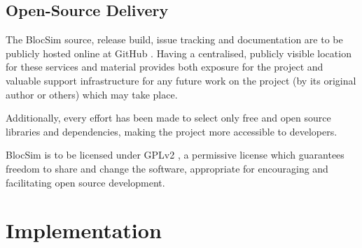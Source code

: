 



\clearpage


\section{Open-Source Delivery}

The BlocSim source, release build, issue tracking and documentation are to be publicly hosted online at GitHub \cite{blocsim}\cite{github}. Having a centralised, publicly visible location for these services and material provides both exposure for the project and valuable support infrastructure for any future work on the project (by its original author or others) which may take place. 

Additionally, every effort has been made to select only free and open source libraries and dependencies, making the project more accessible to developers.

BlocSim is to be licensed under GPLv2 \cite{gplv2}, a permissive license which guarantees freedom to share and change the software, appropriate for encouraging and facilitating open source development.
\\



\chapter{Implementation}

